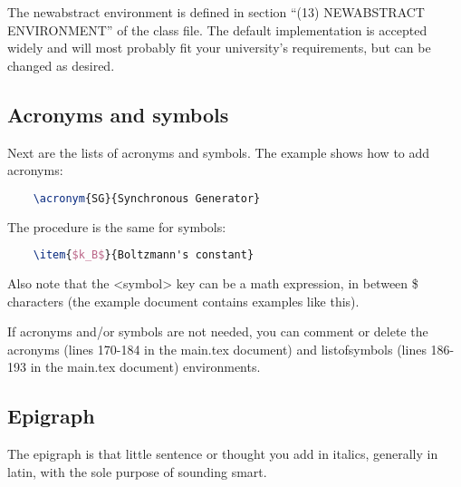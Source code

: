 		The {\ttfamily\small newabstract} environment is defined in section {\ttfamily\small ``(13) NEWABSTRACT ENVIRONMENT''} of the class file. The default implementation is accepted widely and will most probably fit your university's requirements, but can be changed as desired.

	\subsection{Acronyms and symbols}%

	Next are the lists of acronyms and symbols. The example shows how to add acronyms:

\begin{lstlisting}[caption = {Adding an acronym}, label = {lst:addingAcronym}, style = prettyListing, language = tex]
	%\acronym{<acronym>}{<What the acroym means>}
	\acronym{SG}{Synchronous Generator}
\end{lstlisting}

	The procedure is the same for symbols:

\begin{lstlisting}[caption = {Adding an acronym}, label = {lst:addingAcronym}, style = prettyListing, language = tex]
	%\item{<symbol>}{<What the symbol means>}
	\item{$k_B$}{Boltzmann's constant}
\end{lstlisting}

	Also note that the {\ttfamily\small <symbol>} key can be a math expression, in between {\ttfamily\small \$} characters (the example document contains examples like this).

	If acronyms and/or symbols are not needed, you can comment or delete the {\ttfamily\small acronyms} (lines 170-184 in the {\ttfamily\small main.tex} document) and {\ttfamily\small listofsymbols} (lines 186-193 in the {\ttfamily\small main.tex} document) environments.

	\subsection{Epigraph}%

	The epigraph is that little sentence or thought you add in italics, generally in latin, with the sole purpose of sounding smart.

